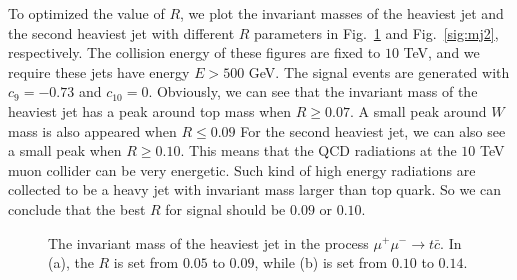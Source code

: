 \documentclass[a4paper,11pt]{article}
\begin{document}
To optimized the value of $R$, we plot the invariant masses of the heaviest jet and the second heaviest jet with different $R$ parameters in Fig.~\ref{sig:mj1} and Fig.~\ref{sig:mj2}, respectively.
The collision energy of these figures are fixed to $10$ TeV, and we require these jets have energy $E>500$ GeV. 
The signal events are generated with $c_{9}=-0.73$ and $c_{10}=0$.
Obviously, we can see that the invariant mass of the heaviest jet has a peak around top mass when $R\geq 0.07$.  
A small peak around $W$ mass is also appeared when $R\leq 0.09$
For the second heaviest jet, we can also see a small peak when $R\geq 0.10$. 
This means that the QCD radiations at the $10$ TeV muon collider can be very energetic. 
Such kind of high energy radiations are collected to be a heavy jet with invariant mass larger than top quark. 
So we can conclude that the best $R$ for signal should be $0.09$ or $0.10$.

\begin{figure}[htbp]
  \centering
  \caption{The invariant mass of the heaviest jet in the process $\mu^+\mu^-\to t\bar{c}$. In (a), the $R$ is set from $0.05$ to $0.09$, while (b) is set from $0.10$ to $0.14$.}\label{sig:mj1}
\end{figure}
\end{document}
